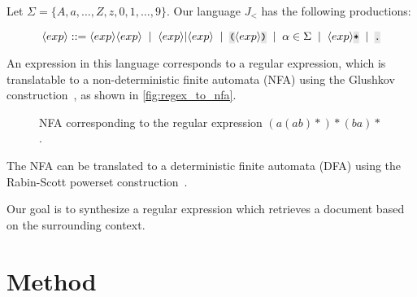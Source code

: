 \documentclass{article}
\newcommand{\inline}[1]{%
    \begingroup%
    \sethlcolor{slightgray}%
    \hl{\ttfamily\footnotesize #1}%
    \endgroup
}
\newcommand{\inline}[1]{%
    \begingroup%
    \sethlcolor{slightgray}%
    \hl{\ttfamily\footnotesize #1}%
    \endgroup
}
\begin{document}
\newcommand{\mor}{\ensuremath{\;\mid\;}}
\newcommand{\code}[1]{\ensuremath{\texttt{\inline{#1}}}}
\newcommand{\bnfrl}[1]{\ensuremath{\langle#1\rangle}}
\allowdisplaybreaks

Let $\Sigma = \{A, a, \ldots, Z, z, 0, 1, \ldots, 9\}$. Our language $J_{<}$ has the following productions:

\begin{equation}
    \bnfrl{exp} ::= \bnfrl{exp}\bnfrl{exp} \mor \bnfrl{exp}|\bnfrl{exp} \mor \code{(}\bnfrl{exp}\code{)} \mor \alpha \in \Sigma \mor \bnfrl{exp}\code{*} \mor
    \code{.}
\end{equation}

An expression in this language corresponds to a regular expression, which is translatable to a non-deterministic finite automata (NFA) using the Glushkov construction~\citep{glushkov1961abstract}, as shown in \autoref{fig:regex_to_nfa}.

\begin{figure}
    \caption{NFA corresponding to the regular expression $(a(ab)*)*(ba)*$.}
    \label{fig:regex_to_nfa}
\end{figure}

The NFA can be translated to a deterministic finite automata (DFA) using the Rabin-Scott powerset construction~\citep{rabin1959finite}.

Our goal is to synthesize a regular expression which retrieves a document based on the surrounding context.

\section{Method}
\end{document}
